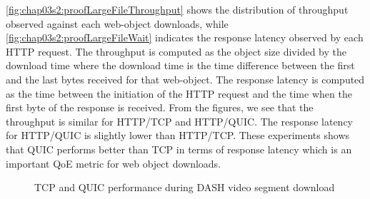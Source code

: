 \fig\ref{fig:chap03s2:proofLargeFileThroughput} shows the distribution of throughput observed against each web-object downloads, while \fig\ref{fig:chap03s2:proofLargeFileWait} indicates the response latency observed by each \ac{HTTP} request. The throughput is computed as the object size divided by the download time where the download time is the time difference between the first and the last bytes received for that web-object. The response latency is computed as the time between the initiation of the \ac{HTTP} request and the time when the first byte of the response is received. From the figures, we see that the throughput is similar for HTTP/TCP and HTTP/QUIC. The response latency for HTTP/QUIC is slightly lower than HTTP/TCP. These experiments shows that \ac{QUIC} performs better than \ac{TCP} in terms of response latency which is an important \ac{QoE} metric for web object downloads.


\begin{figure}[!ht]
	\captionsetup[subfigure]{}
	\begin{center}
		\hfill
	\end{center}
	\caption{\label{fig:chap03s2:dashcomp}\acs{TCP} and \acs{QUIC} performance during DASH video segment download}
\end{figure}


